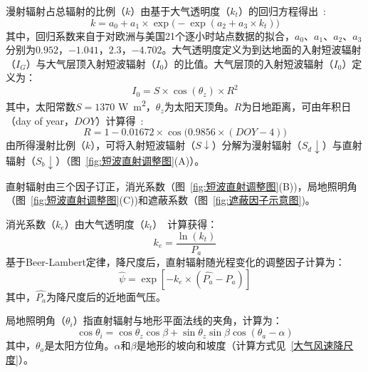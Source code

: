 漫射辐射占总辐射的比例（$k$）由基于大气透明度（$k_{t}$）的回归方程得出~\citep{ruizarias2010}:
\begin{equation}
k=a_{0}+a_{1} \times \exp \big(- \exp \left( a_{2}+a_{3} \times k_{t} \right) \big)
\end{equation}
其中，回归系数来自于对欧洲与美国21个逐小时站点数据的拟合，$a_{0}$、$a_{1}$、$a_{2}$、$a_{3}$分别为$0.952$，$-1.041$，$2.3$，$-4.702$。大气透明度定义为到达地面的入射短波辐射（$I_{G}$）与大气层顶入射短波辐射（$I_{0}$）的比值。大气层顶的入射短波辐射（$I_{0}$）定义为：
\begin{equation}
I_{0}=S \times \cos{\left(\theta_{z}\right)} \times R^{2}
\end{equation}
其中，太阳常数$S=1370$ \unit{W.m^{2}}，$\theta_{z}$为太阳天顶角。$R$为日地距离，可由年积日（day of year，$DOY$）计算得~\citep{eva1998}:
\begin{equation}
R=1-0.01672 \times \cos{\big( 0.9856 \times \left(DOY-4 \right)\big)}
\end{equation}
由所得漫射比例（$k$），可将入射短波辐射（$S\downarrow$）分解为漫射辐射（$S_{d}\downarrow$）与直射辐射（$S_{b}\downarrow$）（图~\ref{fig:短波直射调整图}(A)）。

直射辐射由三个因子订正，消光系数（图~\ref{fig:短波直射调整图}(B))，局地照明角（图~\ref{fig:短波直射调整图}(C))和遮蔽系数（图~\ref{fig:遮蔽因子示意图})。

消光系数（$k_{e}$）由大气透明度（$k_{t}$）~\citep{gupta2016}计算获得：
\begin{equation}
k_{e}=\frac{\ln{\left(k_{t}\right)}}{P_{a}}
\end{equation}
基于Beer-Lambert定律，降尺度后，直射辐射随光程变化的调整因子计算为：
\begin{equation}
\hat{\psi}=\exp{\left[ -k_{e} \times \left(\hat{P_{a}}-P_{a} \right) \right]} 
\end{equation}
其中，$\hat{P_{a}}$为降尺度后的近地面气压。

局地照明角（$\theta_{i}$）指直射辐射与地形平面法线的夹角，计算为：
\begin{equation}
\cos{\theta_{i}}=\cos{\theta_{z}}\cos{\beta}+\sin{\theta_{z}}\sin{\beta}\cos{\left(\theta_{a}-\alpha\right)}
\end{equation}
其中，$\theta_{a}$是太阳方位角。$\alpha$和$\beta$是地形的坡向和坡度（计算方式见~\ref{大气风速降尺度}）。

